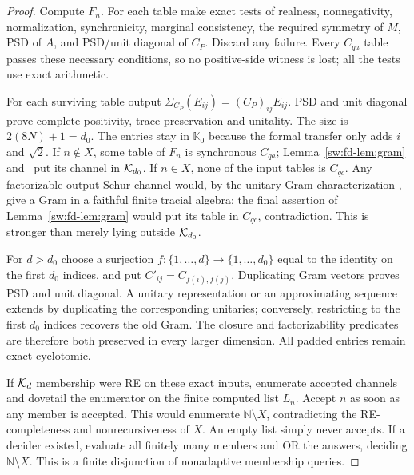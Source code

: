 \begin{proof}
Compute $F_n$. For each table make exact tests of realness, nonnegativity, normalization, synchronicity, marginal consistency, the required symmetry of $M$, PSD of $A$, and PSD/unit diagonal of $C_P$. Discard any failure. Every $C_{qa}$ table passes these necessary conditions, so no positive-side witness is lost; all the tests use exact arithmetic.

For each surviving table output $\Sigma_{C_P}(E_{ij})=(C_P)_{ij}E_{ij}$. PSD and unit diagonal prove complete positivity, trace preservation and unitality. The size is $2(8N)+1=d_0$. The entries stay in $\mathbb K_0$ because the formal transfer only adds $i$ and $\sqrt2$. If $n\notin X$, some table of $F_n$ is synchronous $C_{qa}$; Lemma~\ref{sw:fd-lem:gram} and~\cite[Prop.~3.9(iii)]{Musat25} put its channel in $\mathcal K_{d_0}$. If $n\in X$, none of the input tables is $C_{qc}$. Any factorizable output Schur channel would, by the unitary-Gram characterization \cite[Prop.~3.9(i)]{Musat25}, give a Gram in a faithful finite tracial algebra; the final assertion of Lemma~\ref{sw:fd-lem:gram} would put its table in $C_{qc}$, contradiction. This is stronger than merely lying outside $\mathcal K_{d_0}$.

For $d>d_0$ choose a surjection $f:\{1,\ldots,d\}\to\{1,\ldots,d_0\}$ equal to the identity on the first $d_0$ indices, and put $C'_{ij}=C_{f(i),f(j)}$. Duplicating Gram vectors proves PSD and unit diagonal. A unitary representation or an approximating sequence extends by duplicating the corresponding unitaries; conversely, restricting to the first $d_0$ indices recovers the old Gram. The closure and factorizability predicates are therefore both preserved in every larger dimension. All padded entries remain exact cyclotomic.

If $\mathcal K_d$ membership were RE on these exact inputs, enumerate accepted channels and dovetail the enumerator on the finite computed list $L_n$. Accept $n$ as soon as any member is accepted. This would enumerate $\mathbb N\setminus X$, contradicting the RE-completeness and nonrecursiveness of $X$. An empty list simply never accepts. If a decider existed, evaluate all finitely many members and OR the answers, deciding $\mathbb N\setminus X$. This is a finite disjunction of nonadaptive membership queries.
\end{proof}

